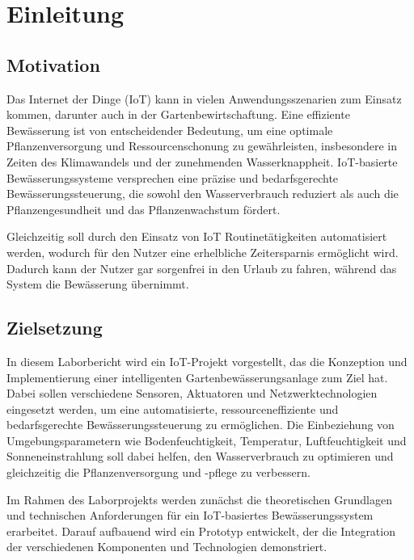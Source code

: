 
\section{Einleitung}

\subsection{Motivation}
Das Internet der Dinge (IoT) kann in vielen Anwendungsszenarien zum Einsatz kommen, darunter auch in der Gartenbewirtschaftung. Eine effiziente Bewässerung ist von entscheidender Bedeutung, um eine optimale Pflanzenversorgung und Ressourcenschonung zu gewährleisten, insbesondere in Zeiten des Klimawandels und der zunehmenden Wasserknappheit. IoT-basierte Bewässerungssysteme versprechen eine präzise und bedarfsgerechte Bewässerungssteuerung, die sowohl den Wasserverbrauch reduziert als auch die Pflanzengesundheit und das Pflanzenwachstum fördert.

Gleichzeitig soll durch den Einsatz von IoT Routinetätigkeiten automatisiert werden, wodurch für den Nutzer eine erhelbliche Zeitersparnis ermöglicht wird.
Dadurch kann der Nutzer gar sorgenfrei in den Urlaub zu fahren, während das System die Bewässerung übernimmt.

\subsection{Zielsetzung}

In diesem Laborbericht wird ein IoT-Projekt vorgestellt, das die Konzeption und Implementierung einer intelligenten Gartenbewässerungsanlage zum Ziel hat. Dabei sollen verschiedene Sensoren, Aktuatoren und Netzwerktechnologien eingesetzt werden, um eine automatisierte, ressourceneffiziente und bedarfsgerechte Bewässerungssteuerung zu ermöglichen. Die Einbeziehung von Umgebungsparametern wie Bodenfeuchtigkeit, Temperatur, Luftfeuchtigkeit und Sonneneinstrahlung soll dabei helfen, den Wasserverbrauch zu optimieren und gleichzeitig die Pflanzenversorgung und -pflege zu verbessern.

Im Rahmen des Laborprojekts werden zunächst die theoretischen Grundlagen und technischen Anforderungen für ein IoT-basiertes Bewässerungssystem erarbeitet. Darauf aufbauend wird ein Prototyp entwickelt, der die Integration der verschiedenen Komponenten und Technologien demonstriert. 

